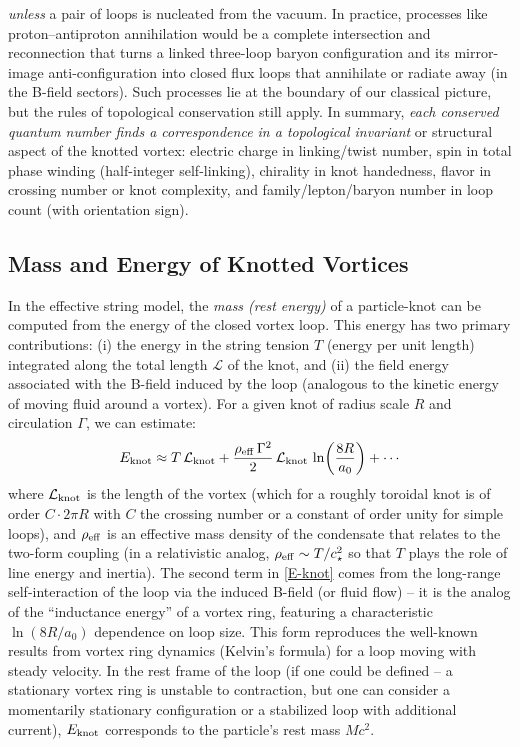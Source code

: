 \documentclass[12pt]{article}
\begin{document}
\begin{itemize}
\emph{unless} a pair of loops is nucleated from the vacuum. In practice, processes like proton–antiproton annihilation would be a complete intersection and reconnection that turns a linked three-loop baryon configuration and its mirror-image anti-configuration into closed flux loops that annihilate or radiate away (in the B-field sectors). Such processes lie at the boundary of our classical picture, but the rules of topological conservation still apply. In summary, \emph{each conserved quantum number finds a correspondence in a topological invariant} or structural aspect of the knotted vortex: electric charge in linking/twist number, spin in total phase winding (half-integer self-linking), chirality in knot handedness, flavor in crossing number or knot complexity, and family/lepton/baryon number in loop count (with orientation sign).
\end{itemize}

\subsection*{Mass and Energy of Knotted Vortices}
In the effective string model, the \emph{mass (rest energy)} of a particle-knot can be computed from the energy of the closed vortex loop. This energy has two primary contributions: (i) the energy in the string tension $T$ (energy per unit length) integrated along the total length $\mathcal{L}$ of the knot, and (ii) the field energy associated with the B-field induced by the loop (analogous to the kinetic energy of moving fluid around a vortex). For a given knot of radius scale $R$ and circulation $\Gamma$, we can estimate:
\begin{equation}
E_{\rm knot} \approx T\,\mathcal{L}_{\rm knot} + \frac{\rho_{\rm eff}\,\Gamma^2}{2}\, \mathcal{L}_{\rm knot}\,\ln\!\left(\frac{8R}{a_0}\right) + \cdots
\label{E-knot}
\end{equation}
where $\mathcal{L}_{\rm knot}$ is the length of the vortex (which for a roughly toroidal knot is of order $C \cdot 2\pi R$ with $C$ the crossing number or a constant of order unity for simple loops), and $\rho_{\rm eff}$ is an effective mass density of the condensate that relates to the two-form coupling (in a relativistic analog, $\rho_{\rm eff} \sim T/c_{\star}^2$ so that $T$ plays the role of line energy and inertia). The second term in \eqref{E-knot} comes from the long-range self-interaction of the loop via the induced B-field (or fluid flow) – it is the analog of the “inductance energy” of a vortex ring, featuring a characteristic $\ln(8R/a_0)$ dependence on loop size. This form reproduces the well-known results from vortex ring dynamics (Kelvin’s formula) for a loop moving with steady velocity. In the rest frame of the loop (if one could be defined – a stationary vortex ring is unstable to contraction, but one can consider a momentarily stationary configuration or a stabilized loop with additional current), $E_{\rm knot}$ corresponds to the particle’s rest mass $M c^2$.
\end{document}
